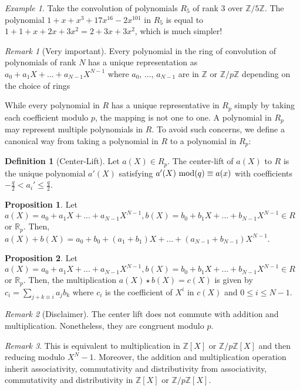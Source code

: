 \documentclass[12pt]{article}
\theoremstyle{definition}
\newtheorem{definition}{Definition}[section]
\theoremstyle{proposition}
\newtheorem{proposition}{Proposition}[section]
\theoremstyle{remark}
\newtheorem*{remark}{Remark}
\theoremstyle{theorem}
\theoremstyle{example}
\newtheorem{example}{Example}[section]
\newcommand{\R}{\mathbb{R}}
\newcommand{\Z}{\mathbb{Z}}
\begin{document}
\begin{example}
    Take the convolution of polynomials $R_5$ of rank $3$ over $\Z/5\Z$. The polynomial $1 + x + x^3 + 17x^{16} - 2x^{101}$ in $R_5$ is equal to $1 + 1 + x + 2x + 3x^2 = 2 + 3x + 3x^2$, which is much simpler!
\end{example}

\begin{remark}[Very important]
    Every polynomial in the ring of convolution of polynomials of rank $N$ has a unique representation as $a_0 + a_1 X + ... + a_{N-1}X^{N-1}$ where $a_0$, ..., $a_{N-1}$ are in $\Z$ or $\Z/p\Z$ depending on the choice of rings
\end{remark}

While every polynomial in $R$ has a unique representative in $R_p$ simply by taking each coefficient modulo $p$, the mapping is not one to one. A polynomial in $R_p$ may represent multiple polynomials in $R$. To avoid such concerns, we define a canonical way from taking a polynomial in $R$ to a polynomial in $R_p$:

\begin{definition} [Center-Lift]
    Let $a(X) \in R_p$. The center-lift of $a(X)$ to $R$ is the unique polynomial $a'(X)$ satisfying $a'(X) \thinspace  \thinspace \mathrm{mod}(q) \equiv a(x)$ with coefficients $-\frac{q}{2} < a_i' \leq \frac{q}{2}$.
\end{definition}

\begin{proposition}
Let $a(X) = a_0 + a_1 X + ... + a_{N-1}X^{N-1}, b(X) = b_0 + b_1 X + ... + b_{N-1}X^{N-1} \in R$ or $\R_p$. Then, $a(X) + b(X) = a_0 + b_0 + (a_1 + b_1) X + ... + (a_{N-1} + b_{N-1})X^{N-1}$. 
\end{proposition}

\begin{proposition}
    Let $a(X) = a_0 + a_1 X + ... + a_{N-1}X^{N-1}, b(X) = b_0 + b_1 X + ... + b_{N-1}X^{N-1} \in R$ or $\R_p$. Then, the multiplication $a(X) \star b(X) = c(X)$ is given by $c_i = \sum_{j + k \equiv i} a_j b_k$ where $c_i$ is the coefficient of $X^i$ in $c(X)$ and $0 \leq i \leq N-1$. 
\end{proposition}

\begin{remark} [Disclaimer]
    The center lift does not commute with addition and multiplication. Nonetheless, they are congruent modulo $p$.
\end{remark}

\begin{remark}
    This is equivalent to multiplication in $\Z[X]$ or $\Z/p\Z [X]$ and then reducing modulo $X^N-1$. Moreover, the addition and multiplication operation inherit associativity, commutativity and distributivity from associativity, commutativity and distributivity in $\Z[X]$ or $\Z/p\Z [X]$.
\end{remark}
\end{document}
